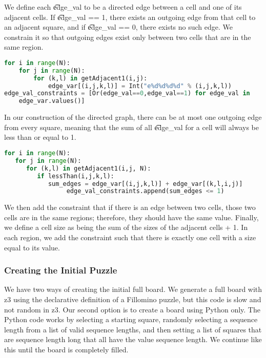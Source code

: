 We define each \t{edge\_val} to be a directed edge between a cell and
one of its adjacent cells. If \t{edge\_val == 1}, there exists an
outgoing edge from that cell to an adjacent square, and if
\t{edge\_val == 0}, there exists no such edge. We constrain it so that
outgoing edges exist only between two cells that are in the same
region.

\singlespace
\begin{lstlisting}[language=python, frame=single]
for i in range(N):
    for j in range(N):
        for (k,l) in getAdjacent1(i,j):
            edge_var[(i,j,k,l)] = Int("e%d%d%d%d" % (i,j,k,l))
edge_val_constraints = [Or(edge_val==0,edge_val==1) for edge_val in
    edge_var.values()]
\end{lstlisting}
\doublespace

In our construction of the directed graph, there can be at most one outgoing edge from every square, meaning that the sum of all \t{edge\_val} for a cell will always be less than or equal to 1.

\singlespace
\begin{lstlisting}[language=python, frame=single]
for i in range(N):
   for j in range(N):
      for (k,l) in getAdjacent1(i,j, N):
         if lessThan(i,j,k,l):
            sum_edges = edge_var[(i,j,k,l)] + edge_var[(k,l,i,j)]
                 edge_val_constraints.append(sum_edges <= 1)
\end{lstlisting}
\doublespace

We then add the constraint that if there is an edge between two cells,
those two cells are in the same regions; therefore, they should have
the same value. Finally, we define a cell size as being the sum of the
sizes of the adjacent cells + 1. In each region, we add the constraint
such that there is exactly one cell with a size equal to its value.

\subsubsection*{Creating the Initial Puzzle}
We have two ways of creating the initial full board. We generate a
full board with z3 using the declarative definition of a Fillomino
puzzle, but this code is slow and not random in z3. Our second option
is to create a board using Python only. The Python code works by
selecting a starting square, randomly selecting a sequence length from
a list of valid sequence lengths, and then setting a list of squares
that are sequence length long that all have the value sequence
length. We continue like this until the board is completely filled.


